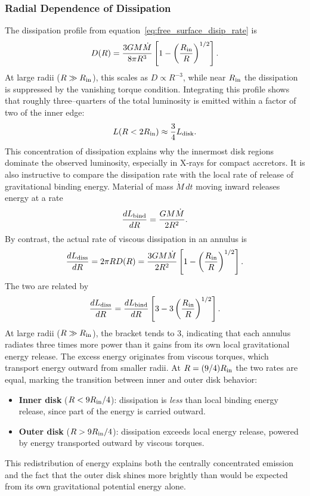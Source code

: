 \subsubsection*{Radial Dependence of Dissipation}
The dissipation profile from equation~\eqref{eq:free_surface_disip_rate} is
\[
D(R) = \frac{3GM\dot{M}}{8\pi R^3}
\left[1 - \left(\frac{R_{\rm in}}{R}\right)^{1/2}\right].
\]
At large radii ($R \gg R_{\rm in}$), this scales as $D \propto R^{-3}$, while near $R_{\rm in}$ the 
dissipation is suppressed by the vanishing torque condition. Integrating this profile shows that roughly three--quarters of the total luminosity is emitted within a factor of two of the inner edge:
\begin{equation}
    L(R < 2R_{\rm in}) \approx \frac{3}{4} L_{\rm disk}.
\end{equation}
This concentration of dissipation explains why the innermost disk regions dominate the observed luminosity, especially in X-rays for compact accretors. It is also instructive to compare the dissipation rate with the local rate of release of gravitational binding energy. Material of mass $\dot{M}\,dt$ moving inward releases energy at a rate
\begin{equation}
    \frac{dL_{\rm bind}}{dR} = \frac{GM\dot{M}}{2R^2}.
\end{equation}
By contrast, the actual rate of viscous dissipation in an annulus is
\begin{equation}
    \frac{dL_{\rm diss}}{dR} = 2\pi R D(R) 
    = \frac{3GM\dot{M}}{2R^2}\left[1 - \left(\frac{R_{\rm in}}{R}\right)^{1/2}\right].
\end{equation}
The two are related by
\begin{equation}
    \frac{dL_{\rm diss}}{dR} = \frac{dL_{\rm bind}}{dR}
    \left[ 3 - 3\left(\frac{R_{\rm in}}{R}\right)^{1/2} \right].
\end{equation}
At large radii ($R \gg R_{\rm in}$), the bracket tends to $3$, indicating that each annulus radiates three times more power than it gains from its own local gravitational energy release.  The excess energy originates from viscous torques, which transport energy outward from smaller radii.  At $R = (9/4)R_{\rm in}$ the two rates are equal, marking the transition between inner and outer disk behavior:
\begin{itemize}
    \item \textbf{Inner disk} ($R < 9R_{\rm in}/4$): dissipation is \emph{less} than local binding energy release, 
    since part of the energy is carried outward.  
    \item \textbf{Outer disk} ($R > 9R_{\rm in}/4$): dissipation exceeds local energy release, powered by energy 
    transported outward by viscous torques.  
\end{itemize}
This redistribution of energy explains both the centrally concentrated emission and the fact that 
the outer disk shines more brightly than would be expected from its own gravitational potential energy alone.

